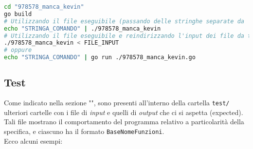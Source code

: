 \documentclass{article}
\begin{document}
\begin{lstlisting}[language=bash, caption=Esempio comandi shell, label=shellcode, basicstyle=\small]
cd "978578_manca_kevin"
go build
# Utilizzando il file eseguibile (passando delle stringhe separate da '\n')
echo "STRINGA_COMANDO" | ./978578_manca_kevin
# Utilizzando il file eseguibile e reindirizzando l'input dei file da testare
./978578_manca_kevin < FILE_INPUT
# oppure
echo "STRINGA_COMANDO" | go run ./978578_manca_kevin.go
\end{lstlisting}

\subsection{Test}
Come indicato nella sezione "", sono presenti all'interno della cartella \texttt{test/} ulteriori cartelle con i file di \textit{input} e quelli di \textit{output} che ci si aspetta (expected).\\
Tali file mostrano il comportamento del programma relativo a particolarità della specifica, e ciascuno ha il formato \texttt{BaseNomeFunzioni}.\\
Ecco alcuni esempi:\\
\end{document}
